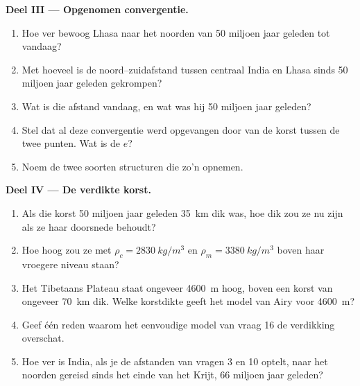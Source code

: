 \begin{problem}
\medskip
\noindent\textbf{Deel III --- Opgenomen convergentie.}
\begin{enumerate}[resume]
  \item Hoe ver bewoog Lhasa naar het noorden van 50 miljoen jaar geleden tot vandaag?
  \item Met hoeveel is de noord--zuidafstand tussen centraal India en
        Lhasa sinds 50 miljoen jaar geleden gekrompen?
  \item Wat is die afstand vandaag, en wat was hij 50 miljoen jaar geleden?
  \item Stel dat al deze convergentie werd opgevangen door  van de
        korst tussen de twee punten. Wat is de  $e$?
  \item Noem de twee soorten structuren die zo'n  opnemen.
\end{enumerate}

\medskip
\noindent\textbf{Deel IV --- De verdikte korst.}
\begin{enumerate}[resume]
  \item Als die korst 50 miljoen jaar geleden \qty{35}{km} dik was, hoe dik
        zou ze nu zijn als ze haar doorsnede behoudt?
  \item Hoe hoog zou ze met $\rho_c = \qty{2830}{kg/m^3}$ en $\rho_m = \qty{3380}{kg/m^3}$
        boven haar vroegere niveau staan?
  \item Het Tibetaans Plateau staat ongeveer \qty{4600}{m} hoog, boven een korst
        van ongeveer \qty{70}{km} dik. Welke korstdikte geeft het model van Airy
        voor \qty{4600}{m}?
  \item Geef één reden waarom het eenvoudige model van vraag 16 de verdikking
        overschat.
  \item Hoe ver is India, als je de afstanden van vragen 3 en 10 optelt,
        naar het noorden gereisd sinds het einde van het Krijt, 66 miljoen jaar
        geleden?
\end{enumerate}
\end{problem}
